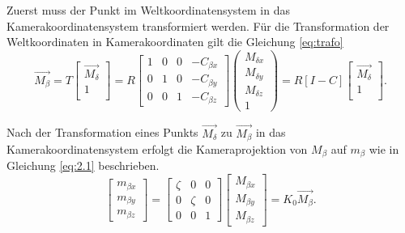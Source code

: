 Zuerst muss der Punkt im Weltkoordinatensystem in das Kamerakoordinatensystem transformiert werden. Für die Transformation der Weltkoordinaten in Kamerakoordinaten gilt die Gleichung \ref{eq:trafo}
\begin{equation}
\overrightarrow{M_\beta}=T
\begin{bmatrix}
\overrightarrow{M_\delta}\\
1\\
\end{bmatrix}=R \begin{bmatrix}1 & 0 & 0 & - C_{\beta x}\\
0 & 1 & 0& - C_{\beta y}\\
0 & 0 & 1 & - C_{\beta z}
\end{bmatrix} 
\begin{pmatrix}
M_{\delta x}\\M_{\delta y}\\ M_{\delta z}\\1
\end{pmatrix}
=R	[I -C] \begin{bmatrix}
\vec{M_\delta}\\
1\\
\end{bmatrix}. \label{mbeta}
\end{equation}

Nach der Transformation eines Punkts $\overrightarrow{M_\delta}$ zu $\overrightarrow{M_\beta}$ in das Kamerakoordinatensystem erfolgt die Kameraprojektion von $M_\beta$ auf $m_\beta$ wie in Gleichung \ref{eq:2.1} beschrieben. %
\begin{equation}
\begin{bmatrix}
m_{\beta x}\\m_{\beta y}\\m_{\beta z}
\end{bmatrix} = \begin{bmatrix}
\zeta&0&0\\
0&\zeta&0\\
0&0&1
\end{bmatrix}
\begin{bmatrix}
M_{\beta x}\\M_{\beta y}\\M_{\beta z}
\end{bmatrix}
=K_0\overrightarrow{M_{\beta}}\label{mbeta1}.
\end{equation}
\pagebreak

